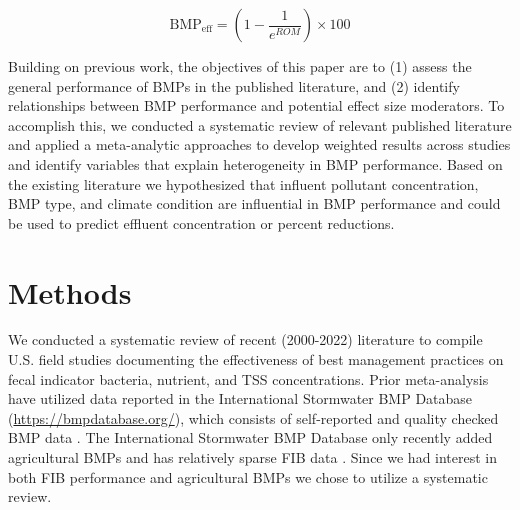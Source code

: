 \documentclass[utf8]{FrontiersinHarvard}
\begin{document}
\[
\text{BMP}_{\text{eff}} = \left( 1 - \frac{1}{e^{ROM}}\right) \times 100
\]

Building on previous work, the objectives of this paper are to (1) assess the general performance of BMPs in the published literature, and (2) identify relationships between BMP performance and potential effect size moderators.
To accomplish this, we conducted a systematic review of relevant published literature and applied a meta-analytic approaches to develop weighted results across studies and identify variables that explain heterogeneity in BMP performance.
Based on the existing literature we hypothesized that influent pollutant concentration, BMP type, and climate condition are influential in BMP performance and could be used to predict effluent concentration or percent reductions.

\hypertarget{methods}{%
\section{Methods}\label{methods}}

We conducted a systematic review of recent (2000-2022) literature to compile U.S. field studies documenting the effectiveness of best management practices on fecal indicator bacteria, nutrient, and TSS concentrations.
Prior meta-analysis have utilized data reported in the International Stormwater BMP Database (\url{https://bmpdatabase.org/}), which consists of self-reported and quality checked BMP data \citep{claryBMPPerformanceAnalysis2011, kochNitrogenRemovalStormwater2014, horvathEffectsRegionalClimate2023}.
The International Stormwater BMP Database only recently added agricultural BMPs and has relatively sparse FIB data \citep{claryBMPPerformanceAnalysis2011, kochNitrogenRemovalStormwater2014}.
Since we had interest in both FIB performance and agricultural BMPs we chose to utilize a systematic review.
\end{document}
